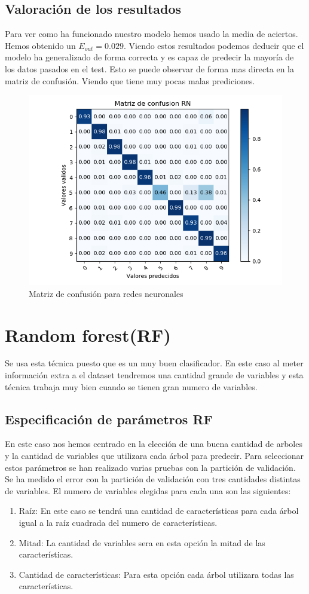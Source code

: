 \documentclass[12pt,a4paper]{article}
\begin{document}
\subsection{Valoración de los resultados}
Para ver como ha funcionado nuestro modelo hemos usado la media de aciertos. Hemos obtenido un $E_{out}=0.029$. Viendo estos resultados podemos deducir que el modelo ha generalizado de forma correcta y es capaz de predecir la mayoría de los datos pasados en el test. Esto se puede observar de forma mas directa en la matriz de confusión. Viendo que tiene muy pocas malas prediciones.
\begin{figure}[H]
	\centering
	\includegraphics[width=0.7\linewidth]{images/confusionMatrixRN.png}
	\caption[Matriz de confusión para redes neuronales]{Matriz de confusión para redes neuronales}
	\label{fig:MatrizConfusio0nRN}
\end{figure}
\section{Random forest(RF)}	
Se usa esta técnica puesto que es un muy buen clasificador. En este caso al meter información extra a el dataset tendremos una cantidad grande de variables y esta técnica trabaja muy bien cuando se tienen gran numero de variables.
\subsection{Especificación de parámetros RF} 
En este caso nos hemos centrado en la elección de una buena cantidad de arboles y la cantidad de variables que utilizara cada árbol para predecir. Para seleccionar estos parámetros se han realizado varias pruebas con la partición de validación. Se ha medido el error con la partición de validación con tres cantidades distintas de variables. El numero de variables elegidas para cada una son las siguientes:
\begin{enumerate}
	\item Raíz: En este caso se tendrá una cantidad de características para cada árbol igual a la raíz cuadrada del numero de características. 
	\item Mitad: La cantidad de variables sera en esta opción la mitad de las características.
	\item Cantidad de características: Para esta opción cada árbol utilizara todas las características.
\end{enumerate}
\end{document}
